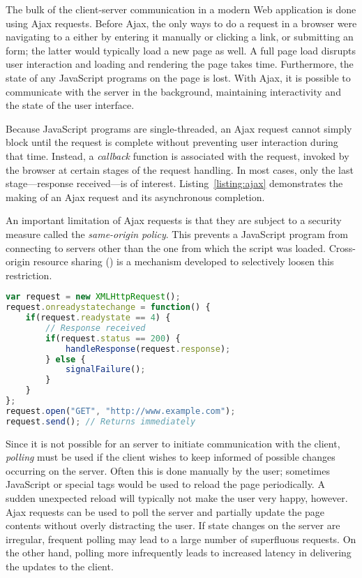 The bulk of the client-server communication in a modern Web application is done using Ajax requests. Before Ajax, the only ways to do a  request in a browser were navigating to a  either by entering it manually or clicking a link, or submitting an  form; the latter would typically load a new page as well. A full page load disrupts user interaction and loading and rendering the page takes time. Furthermore, the state of any JavaScript programs on the page is lost. With Ajax, it is possible to communicate with the server in the background, maintaining interactivity and the state of the user interface. 

Because JavaScript programs are single-threaded, an Ajax request cannot simply block until the request is complete without preventing user interaction during that time. Instead, a \emph{callback} function is associated with the request, invoked by the browser at certain stages of the request handling. In most cases, only the last stage---response received---is of interest. Listing~\ref{listing:ajax} demonstrates the making of an Ajax request and its asynchronous completion.

An important limitation of Ajax requests is that they are subject to a security measure called the \emph{same-origin policy}. This prevents a JavaScript program from connecting to servers other than the one from which the script was loaded. Cross-origin resource sharing () is a mechanism developed to selectively loosen this restriction.

\begin{code}
\begin{lstlisting}[language=JavaScript,caption=Making an Ajax request.\label{listing:ajax}]
var request = new XMLHttpRequest();
request.onreadystatechange = function() {
    if(request.readystate == 4) {
        // Response received
        if(request.status == 200) {
            handleResponse(request.response);
        } else {
            signalFailure();
        }
    }
};
request.open("GET", "http://www.example.com");
request.send(); // Returns immediately
\end{lstlisting}
\end{code}

Since it is not possible for an  server to initiate communication with the client, \emph{polling} must be used if the client wishes to keep informed of possible changes occurring on the server. Often this is done manually by the user; sometimes JavaScript or special  tags would be used to reload the page periodically. A sudden unexpected reload will typically not make the user very happy, however. Ajax requests can be used to poll the server and partially update the page contents without overly distracting the user. If state changes on the server are irregular, frequent polling may lead to a large number of superfluous requests. On the other hand, polling more infrequently leads to increased latency in delivering the updates to the client.

